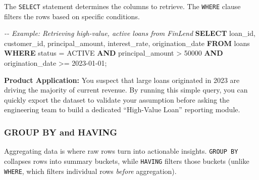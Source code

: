 \documentclass[
  11pt,
  openany,
  oneside]{book}
\newenvironment{Shaded}{}{}
\newcommand{\CommentTok}[1]{\textcolor[rgb]{0.38,0.63,0.69}{\textit{#1}}}
\newcommand{\DecValTok}[1]{\textcolor[rgb]{0.25,0.63,0.44}{#1}}
\newcommand{\KeywordTok}[1]{\textcolor[rgb]{0.00,0.44,0.13}{\textbf{#1}}}
\newcommand{\NormalTok}[1]{#1}
\newcommand{\OperatorTok}[1]{\textcolor[rgb]{0.40,0.40,0.40}{#1}}
\newcommand{\StringTok}[1]{\textcolor[rgb]{0.25,0.44,0.63}{#1}}
\begin{document}
The \texttt{SELECT} statement determines the columns to retrieve. The
\texttt{WHERE} clause filters the rows based on specific conditions.

\begin{Shaded}
\begin{Highlighting}[]
\CommentTok{{-}{-} Example: Retrieving high{-}value, active loans from FinLend}
\KeywordTok{SELECT} 
\NormalTok{    loan\_id, }
\NormalTok{    customer\_id, }
\NormalTok{    principal\_amount, }
\NormalTok{    interest\_rate, }
\NormalTok{    origination\_date}
\KeywordTok{FROM}\NormalTok{ loans}
\KeywordTok{WHERE}\NormalTok{ status }\OperatorTok{=} \StringTok{\textquotesingle{}ACTIVE\textquotesingle{}} 
  \KeywordTok{AND}\NormalTok{ principal\_amount }\OperatorTok{\textgreater{}} \DecValTok{50000}
  \KeywordTok{AND}\NormalTok{ origination\_date }\OperatorTok{\textgreater{}=} \StringTok{\textquotesingle{}2023{-}01{-}01\textquotesingle{}}\NormalTok{;}
\end{Highlighting}
\end{Shaded}

\textbf{Product Application:} You suspect that large loans originated in
2023 are driving the majority of current revenue. By running this simple
query, you can quickly export the dataset to validate your assumption
before asking the engineering team to build a dedicated ``High-Value
Loan'' reporting module.

\subsubsection{GROUP BY and HAVING}\label{group-by-and-having}

Aggregating data is where raw rows turn into actionable insights.
\texttt{GROUP\ BY} collapses rows into summary buckets, while
\texttt{HAVING} filters those buckets (unlike \texttt{WHERE}, which
filters individual rows \emph{before} aggregation).
\end{document}
